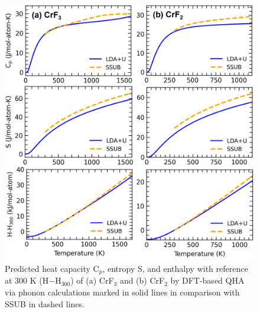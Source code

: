 \begin{figure}[ht]
    \centering
    \includegraphics[width=0.75\linewidth]{moltensalts/Moltensalts-FLiNaKCr-Benchmark-Cr.jpg}
    \caption{Predicted heat capacity C$_p$, entropy S, and enthalpy with reference at 300 K (H$-$H$_{300}$) of (a) CrF$_3$ and (b) CrF$_2$ by DFT-based QHA via phonon calculations marked in solid lines in comparison with SSUB \cite{sgteurl} in dashed lines.}
    \label{ms:fig:FLiNaKCr-Benchmark-Cr}
\end{figure}

